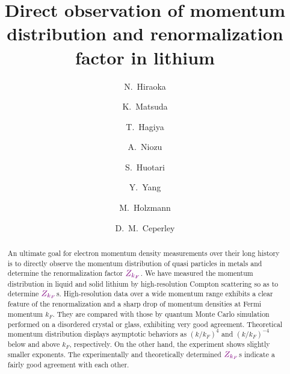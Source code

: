 \documentclass[twocolumn,showpacs,showkeys,fleqn,prl,superscriptaddress]{revtex4}%
\begin{document}

\title{
Direct observation of momentum distribution and renormalization factor in lithium
}

\author{ 
N.~Hiraoka
}

\author{ 
K.~Matsuda
}

\author{ 
T.~Hagiya
}
  
\author{ 
A.~Niozu
}


\author{ 
S.~Huotari
}

\author{ 
Y.~Yang
}

\author{ 
M.~Holzmann
}

\author{ 
D.~M.~Ceperley
}







\date{}
\begin{abstract}

An ultimate goal for electron momentum density measurements over their long history is to directly observe the momentum distribution of quasi particles in metals and determine the renormalization factor ${\color{violet}Z_{k_F}}$.
We have measured the momentum distribution in liquid and solid lithium by high-resolution Compton scattering so as to determine ${\color{violet}Z_{k_F}}$s.
High-resolution data over a wide momentum range exhibits a clear feature of the renormalization and a sharp drop of momentum densities at Fermi momentum $k_F$.
They are compared with those by quantum Monte Carlo simulation performed on a disordered crystal or glass, exhibiting very good agreement.        
Theoretical momentum distribution displays asymptotic behaviors as $(k/k_F)^4$ and $(k/k_F)^{-4}$ below and above $k_F$, respectively.
On the other hand, the experiment shows slightly smaller exponents. 
The experimentally and theoretically determined ${\color{violet}Z_{k_F}}$s indicate a fairly good agreement with each other.


\end{abstract}
\maketitle
\end{document}
